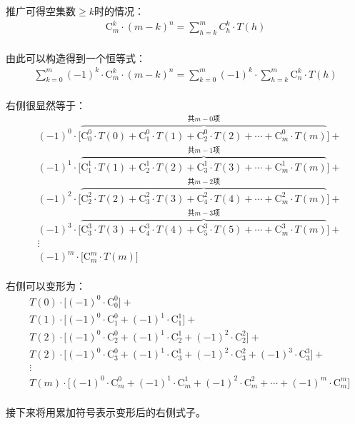 \documentclass[UTF8]{ctexart}
\newcommand{\Co}{\mathrm{C}}
\begin{document}
\newpage

    推广可得空集数$\geq k$时的情况：
    \begin{align}
        \Co_m^k\cdot(m-k)^n=\sum_{h=k}^mC_h^k\cdot T(h)
    \end{align}\\
    由此可以构造得到一个恒等式：
    \begin{align}
        \sum_{k=0}^m(-1)^k\cdot\Co_m^k\cdot(m-k)^n=\sum_{k=0}^m(-1)^k\cdot\sum_{h=k}^m\Co_n^k\cdot T(h)
    \end{align}\\
    右侧很显然等于：
    \begin{align}
        &(-1)^0\cdot\Big[\overbrace{\Co_0^0\cdot T(0)+\Co_1^0\cdot T(1)+\Co_2^0\cdot T(2)+\cdots+\Co_m^0\cdot T(m)}^{\text{共}m-0\text{项}}\Big]+\\[2mm]
        &(-1)^1\cdot\Big[\overbrace{\Co_1^1\cdot T(1)+\Co_2^1\cdot T(2)+\Co_3^1\cdot T(3)+\cdots+\Co_m^1\cdot T(m)}^{\text{共}m-1\text{项}}\Big]+\\[2mm]
        &(-1)^2\cdot\Big[\overbrace{\Co_2^2\cdot T(2)+\Co_3^2\cdot T(3)+\Co_4^2\cdot T(4)+\cdots+\Co_m^2\cdot T(m)}^{\text{共}m-2\text{项}}\Big]+\\[2mm]
        &(-1)^3\cdot\Big[\overbrace{\Co_3^3\cdot T(3)+\Co_4^3\cdot T(4)+\Co_5^3\cdot T(5)+\cdots+\Co_m^3\cdot T(m)}^{\text{共}m-3\text{项}}\Big]+\\[1mm]
        &\vdots\\[1mm]
        &(-1)^m\cdot\Big[\Co_m^m\cdot T(m)\Big]
    \end{align}\\
    右侧可以变形为：
    \begin{align}
        &T(0)\cdot\Big[(-1)^0\cdot \Co_0^0\Big]+\\[2mm]
        &T(1)\cdot\Big[(-1)^0\cdot \Co_1^0+(-1)^1\cdot \Co_1^1\Big]+\\[2mm]
        &T(2)\cdot\Big[(-1)^0\cdot \Co_2^0+(-1)^1\cdot \Co_2^1+(-1)^2\cdot \Co_2^2\Big]+\\[2mm]
        &T(2)\cdot\Big[(-1)^0\cdot \Co_3^0+(-1)^1\cdot \Co_3^1+(-1)^2\cdot \Co_3^2+(-1)^3\cdot \Co_3^3\Big]+\\[1mm]
        &\vdots\\[1mm]
        &T(m)\cdot\Big[(-1)^0\cdot \Co_m^0+(-1)^1\cdot \Co_m^1+(-1)^2\cdot \Co_m^2+\cdots+(-1)^m\cdot \Co_m^m\Big]
    \end{align}\\
    接下来将用累加符号表示变形后的右侧式子。

\newpage
\end{document}
